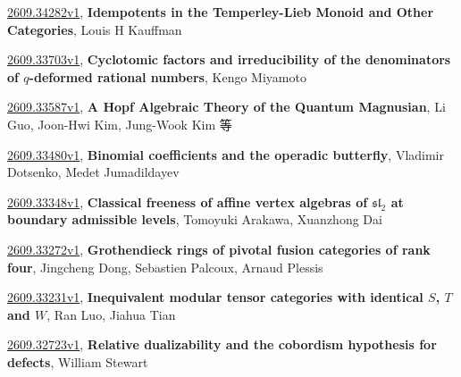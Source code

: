 \documentclass[9pt, a4paper]{article}
\theoremstyle{plain}
\theoremstyle{definition}
\theoremstyle{remark}
\newcommand{\arxiv}[3]{\href{https://arxiv.org/abs/#1}{#1}, \textbf{\textcolor{arxivblue}{#2}}, #3}
\begin{document}
\arxiv{2609.34282v1}{Idempotents in the Temperley-Lieb Monoid and Other Categories}{Louis H Kauffman}

\arxiv{2609.33703v1}{Cyclotomic factors and irreducibility of the denominators of $q$-deformed rational numbers}{Kengo Miyamoto}

\arxiv{2609.33587v1}{A Hopf Algebraic Theory of the Quantum Magnusian}{Li Guo, Joon-Hwi Kim, Jung-Wook Kim 等}

\arxiv{2609.33480v1}{Binomial coefficients and the operadic butterfly}{Vladimir Dotsenko, Medet Jumadildayev}

\arxiv{2609.33348v1}{Classical freeness of affine vertex algebras of $\mathfrak{sl}_2$ at boundary admissible levels}{Tomoyuki Arakawa, Xuanzhong Dai}

\arxiv{2609.33272v1}{Grothendieck rings of pivotal fusion categories of rank four}{Jingcheng Dong, Sebastien Palcoux, Arnaud Plessis}

\arxiv{2609.33231v1}{Inequivalent modular tensor categories with identical $S$, $T$ and $W$}{Ran Luo, Jiahua Tian}

\arxiv{2609.32723v1}{Relative dualizability and the cobordism hypothesis for defects}{William Stewart}

\end{document}
